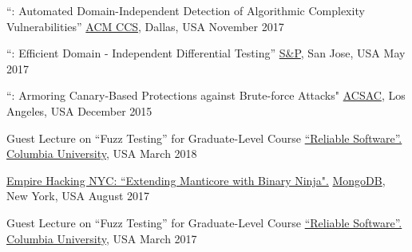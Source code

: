 
\vspace{0.025in}

\vspace{0.025in}
\begin{cvhonorswide2}
    \cvhonorwide
    {}
    {``\slowfuzz: Automated Domain-Independent Detection of Algorithmic Complexity Vulnerabilities''}
    {\href{https://ccs2017.sigsac.org/}{ACM CCS}, Dallas, USA}
    {November 2017}
\end{cvhonorswide2}

\vspace{0.025in}
\begin{cvhonorswide2}
    \cvhonorwide
    {}
    {``\nezha: Efficient Domain - Independent Differential Testing''}
    {\href{https://www.ieee-security.org/TC/SP2017/}{S\&P}, San Jose, USA}
    {May 2017}
\end{cvhonorswide2}

\vspace{0.025in}
\begin{cvhonorswide2}
  \cvhonorwide
    {}
    {``\dynaguard: Armoring Canary-Based Protections against Brute-force Attacks"}
    {\href{https://www.acsac.org/2015/}{ACSAC}, Los Angeles, USA}
    {December 2015}

\end{cvhonorswide2}


\vspace{0.025in}
\begin{cvhonorswide2}
\cvhonorwide
    {}
    {Guest Lecture on ``Fuzz Testing'' for Graduate-Level Course \href{http://www.cs.columbia.edu/~junfeng/18sp-e6121/syllabus.html}{``Reliable Software''.}}
    {\href{http://www.cs.columbia.edu/}{Columbia University}, USA}
    {March 2018}
\end{cvhonorswide2}

\vspace{0.025in}
\begin{cvhonorswide2}
\cvhonorwide
    {}
    {\href{https://www.meetup.com/Empire-Hacking/events/239192018}{Empire
            Hacking NYC: ``Extending Manticore with Binary Ninja".}}
    {\href{https://www.mongodb.com/}{MongoDB}, New York, USA}
    {August 2017}
\end{cvhonorswide2}

\vspace{0.025in}
\begin{cvhonorswide2}
\cvhonorwide
    {}
    {Guest Lecture on ``Fuzz Testing'' for Graduate-Level Course \href{http://www.cs.columbia.edu/~junfeng/17sp-e6121/syllabus.html}{``Reliable Software''.}}
    {\href{http://www.cs.columbia.edu/}{Columbia University}, USA}
    {March 2017}
\end{cvhonorswide2}

